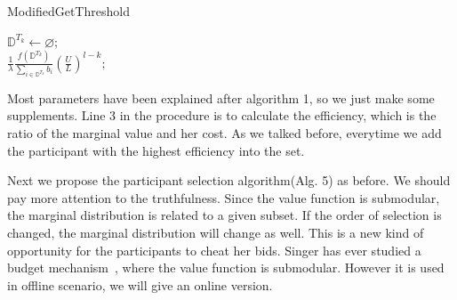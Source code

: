 \documentclass[10pt,journal,letterpaper,compsoc]{IEEEtran}
\begin{document}
\begin{algorithm}
\BlankLine
{}
\caption{ModifiedGetThreshold}
\label{alg:GetThreshold}
\begin{small}
\BlankLine
$\mathbb{D}^{T_k}\leftarrow\varnothing$;\\
\Return $\frac{1}{\lambda}\frac{f(\mathbb{D}^{T_k})}{\sum_{i\in\mathbb{D}^{T_k}}b_i}\left(\frac{U}{L}\right)^{l-k};$
\end{small}
\end{algorithm}
Most parameters have been explained after algorithm 1, so we just make some supplements. Line 3 in the procedure is to calculate the efficiency, which is the ratio of the marginal value and her cost. As we talked before, everytime we add the participant with the highest efficiency into the set.

Next we propose the participant selection algorithm(Alg. 5) as before. We should pay more attention to the truthfulness. Since the value function is submodular, the marginal distribution is related to a given subset. If the order of selection is changed, the marginal distribution will change as well. This is a new kind of opportunity for the participants to cheat her bids. Singer has ever studied a budget mechanism~\cite{singer2010budget}, where the value function is submodular. However it is used in offline scenario, we will give an online version.
\end{document}
